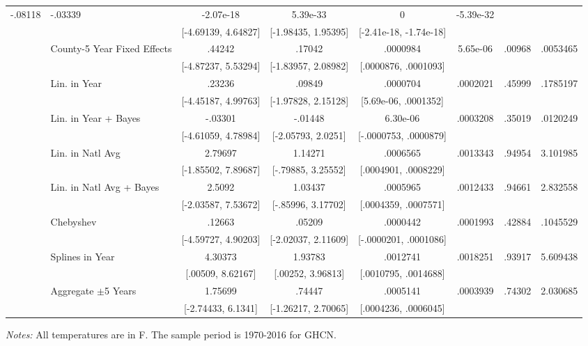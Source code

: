 \begin{landscape}
\begin{table}[htb]
\begin{threeparttable}
{\begin{tabular}{llcccccc}
-.08118 & -.03339 & -2.07e-18 & 5.39e-33 & 0 & -5.39e-32 \\  & & [-4.69139, 4.64827] & [-1.98435, 1.95395] & [-2.41e-18, -1.74e-18] & & \\  & \multirow{2}{*}{County-5 Year Fixed Effects} & .44242 & .17042 &  .0000984 & 5.65e-06 & .00968 & .0053465 \\  & & [-4.87237, 5.53294] & [-1.83957, 2.08982] & [.0000876, .0001093] & & \\  & \multirow{2}{*}{Lin. in Year} & .23236 & .09849 &  .0000704 & .0002021 & .45999 & .1785197 \\  & & [-4.45187, 4.99763] & [-1.97828, 2.15128] & [5.69e-06, .0001352] & & \\  & \multirow{2}{*}{Lin. in Year + Bayes} & -.03301 & -.01448 &  6.30e-06 & .0003208 & .35019 & .0120249 \\  & & [-4.61059, 4.78984] & [-2.05793, 2.0251] & [-.0000753, .0000879] & & \\  & \multirow{2}{*}{Lin. in Natl Avg} & 2.79697 & 1.14271 &  .0006565 & .0013343 & .94954 & 3.101985 \\  & & [-1.85502, 7.89687] & [-.79885, 3.25552] & [.0004901, .0008229] & & \\  & \multirow{2}{*}{Lin. in Natl Avg + Bayes} & 2.5092 & 1.03437 &  .0005965 & .0012433 & .94661 & 2.832558 \\  & & [-2.03587, 7.53672] & [-.85996, 3.17702] & [.0004359, .0007571] & & \\  & \multirow{2}{*}{Chebyshev} & .12663 & .05209 &  .0000442 & .0001993 & .42884 & .1045529 \\  & & [-4.59727, 4.90203] & [-2.02037, 2.11609] & [-.0000201, .0001086] & & \\  & \multirow{2}{*}{Splines in Year} & 4.30373 & 1.93783 &  .0012741 & .0018251 & .93917 & 5.609438 \\  & & [.00509, 8.62167] & [.00252, 3.96813] & [.0010795, .0014688] & & \\  & \multirow{2}{*}{Aggregate \(\pm\)5 Years} & 1.75699 & .74447 &  .0005141 & .0003939 & .74302 & 2.030685 \\  & & [-2.74433, 6.1341] & [-1.26217, 2.70065] & [.0004236, .0006045] & & \\
\hline \hline
\end{tabular}
}
\begin{tablenotes}
\footnotesize \textit{Notes:} All temperatures are in \degree F. The sample period is 1970-2016 for GHCN.
\end{tablenotes}
\end{threeparttable}
\end{table}
\end{landscape}
\restoregeometry
